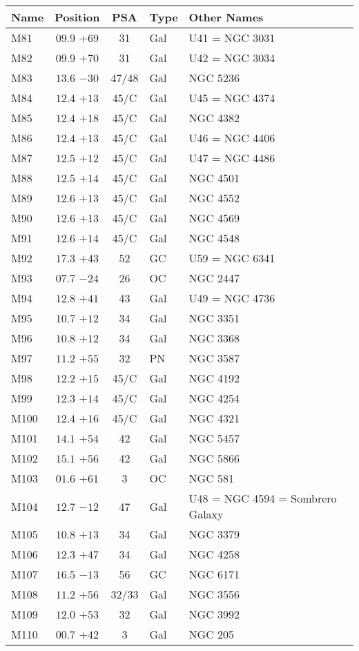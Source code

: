 \begin{table}[t]
\setlength{\tabcolsep}{3pt}
\small
\begin{tabular}{lcclll}
\hline
Name&Position&PSA&Type&Other Names\\
\hline
M81  &$09.9$ $+69$&31&Gal&U41 = NGC 3031\\
M82  &$09.9$ $+70$&31&Gal&U42 = NGC 3034\\
M83  &$13.6$ $-30$&47/48&Gal&NGC 5236\\
M84  &$12.4$ $+13$&45/C&Gal&U45 = NGC 4374\\
M85  &$12.4$ $+18$&45/C&Gal&NGC 4382\\
M86  &$12.4$ $+13$&45/C&Gal&U46 = NGC 4406\\
M87  &$12.5$ $+12$&45/C&Gal&U47 = NGC 4486\\
M88  &$12.5$ $+14$&45/C&Gal&NGC 4501\\
M89  &$12.6$ $+13$&45/C&Gal&NGC 4552\\
M90  &$12.6$ $+13$&45/C&Gal&NGC 4569\\
M91  &$12.6$ $+14$&45/C&Gal&NGC 4548\\
M92  &$17.3$ $+43$&52&GC &U59 = NGC 6341\\
M93  &$07.7$ $-24$&26&OC &NGC 2447\\
M94  &$12.8$ $+41$&43&Gal&U49 = NGC 4736\\
M95  &$10.7$ $+12$&34&Gal&NGC 3351\\
M96  &$10.8$ $+12$&34&Gal&NGC 3368\\
M97  &$11.2$ $+55$&32&PN &NGC 3587\\
M98  &$12.2$ $+15$&45/C&Gal&NGC 4192\\
M99  &$12.3$ $+14$&45/C&Gal&NGC 4254\\
M100 &$12.4$ $+16$&45/C&Gal&NGC 4321\\
M101 &$14.1$ $+54$&42&Gal&NGC 5457\\
M102 &$15.1$ $+56$&42&Gal&NGC 5866\\
M103 &$01.6$ $+61$&3&OC &NGC 581\\
M104 &$12.7$ $-12$&47&Gal&U48 = NGC 4594 = Sombrero Galaxy\\
M105 &$10.8$ $+13$&34&Gal&NGC 3379\\
M106 &$12.3$ $+47$&34&Gal&NGC 4258\\
M107 &$16.5$ $-13$&56&GC &NGC 6171\\
M108 &$11.2$ $+56$&32/33&Gal&NGC 3556\\
M109 &$12.0$ $+53$&32&Gal&NGC 3992\\
M110 &$00.7$ $+42$&3&Gal&NGC 205\\
\hline
\end{tabular}
\end{table}

